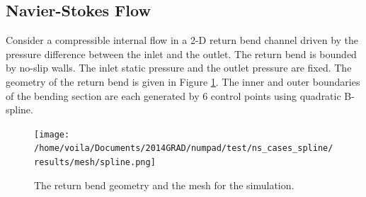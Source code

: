 \subsection{Navier-Stokes Flow}
\label{sec: chap2 num example NS}
Consider
a compressible internal flow in a 2-D return bend channel 
driven by the pressure difference between the inlet and the outlet.
The return bend is bounded by 
no-slip walls. The inlet static pressure and the outlet pressure are fixed.
The geometry of the return bend is given in Figure \ref{fig: NS mesh}.
The inner and outer boundaries of the bending section are each generated by 6 control points
using quadratic B-spline.\\
\begin{figure}[htbp]\begin{center}
    \texttt{[image: /home/voila/Documents/2014GRAD/numpad/test/ns\_cases\_spline/results/mesh/spline.png]}
    \caption{The return bend geometry and the mesh for the simulation.}
    \label{fig: NS mesh}
\end{center}\end{figure}

